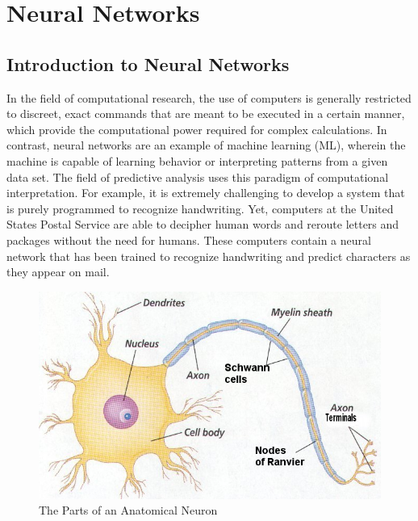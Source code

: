 \chapter{Neural Networks}
\section{Introduction to Neural Networks}

In the field of computational research, the use of computers is generally restricted to discreet, exact commands that are meant to be executed in a certain manner, which  provide the computational power required for complex calculations.
In contrast, neural networks are an example of machine learning (ML), wherein the machine is capable of learning behavior or interpreting patterns from a given data set.
The field of predictive analysis uses this paradigm of computational interpretation.
For example, it is extremely challenging to develop a system that is purely programmed to recognize handwriting.
Yet, computers at the United States Postal Service are able to decipher human words and reroute letters and packages without the need for humans.
These computers contain a neural network that has been trained to recognize handwriting and predict characters as they appear on mail. \cite{nielsen} 

\begin{figure}[htbp!]
   \centering
   \includegraphics[scale=0.75]{pictures/NeuralNetworks/neuron.jpg} 
   \caption{The Parts of an Anatomical Neuron}
   \label{fig:neuron}
\end{figure}

